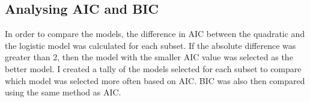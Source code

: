 \documentclass{article}
\begin{document}
\begin{flushleft}
\subsection{Analysing AIC and BIC}

In order to compare the models, the difference in AIC between the quadratic and the logistic model was calculated for each subset. If the absolute difference was greater than 2, then the model with the smaller AIC value was selected as the better model. I created a tally of the models selected for each subset to compare which model was selected more often based on AIC. BIC was also then compared using the same method as AIC.





\end{flushleft}
\end{document}
